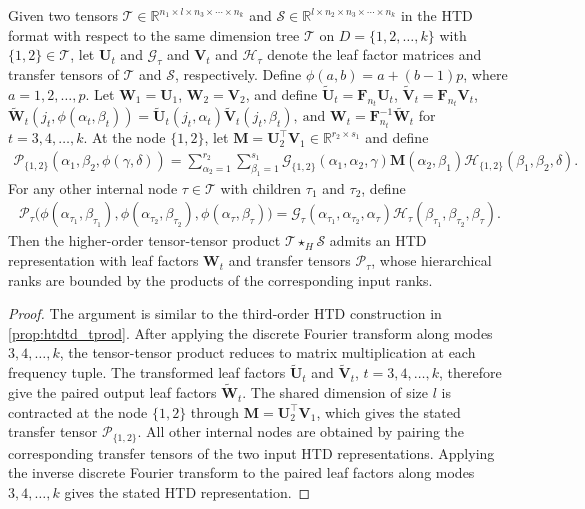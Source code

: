 \documentclass[onefignum,onetabnum]{siamart250211}
\begin{document}
\begin{proposition}
\label{thm:htd_kth_tprod_core}
Given two tensors
$\mathscr{T}\in\mathbb{R}^{n_1\times l\times n_3\times\cdots\times n_k}$
and
$\mathscr{S}\in\mathbb{R}^{l\times n_2\times n_3\times\cdots\times n_k}$
in the HTD format with respect to the same dimension tree
$\mathcal{T}$ on $D=\{1,2, \dots,k\}$ with $\{1,2\}\in\mathcal{T}$,
let $\textbf{U}_t$ and $\mathscr{G}_\tau$ and $\textbf{V}_t$ and $\mathscr{H}_\tau$
denote the leaf factor matrices and transfer tensors of $\mathscr{T}$ and
$\mathscr{S}$, respectively. Define $\phi(a,b)=a+(b-1)p$, where $a = 1,2, \dots,p$.
Let $\textbf{W}_1=\textbf{U}_1$, $\textbf{W}_2=\textbf{V}_2$, and define
$\widetilde{\textbf{U}}_t=\textbf{F}_{n_t}\textbf{U}_t$,
$\widetilde{\textbf{V}}_t=\textbf{F}_{n_t}\textbf{V}_t$,
$\widetilde{\textbf{W}}_t(j_t,\phi(\alpha_t,\beta_t))
=
\widetilde{\textbf{U}}_t(j_t,\alpha_t)
\widetilde{\textbf{V}}_t(j_t,\beta_t),
\ \text{and }
\textbf{W}_t=\textbf{F}_{n_t}^{-1}\widetilde{\textbf{W}}_t$ for
$t=3, 4, \dots,k$. At the node
$\{1,2\}$, let $\textbf{M}=\textbf{U}_2^\top\textbf{V}_1\in\mathbb{R}^{r_2\times s_1}$
and define
\begin{align*}
\mathscr{P}_{\{1,2\}}(\alpha_1,\beta_2,\phi(\gamma,\delta))
=
\sum_{\alpha_2=1}^{r_2}\sum_{\beta_1=1}^{s_1}
\mathscr{G}_{\{1,2\}}(\alpha_1,\alpha_2,\gamma)
\textbf{M}(\alpha_2,\beta_1)
\mathscr{H}_{\{1,2\}}(\beta_1,\beta_2,\delta).
\end{align*}
For any other internal node $\tau\in\mathcal{T}$ with children $\tau_1$ and
$\tau_2$, define
\begin{align*}
\mathscr{P}_\tau
\bigl(\phi(\alpha_{\tau_1},\beta_{\tau_1}),
      \phi(\alpha_{\tau_2},\beta_{\tau_2}),
      \phi(\alpha_\tau,\beta_\tau)\bigr)
=
\mathscr{G}_\tau(\alpha_{\tau_1},\alpha_{\tau_2},\alpha_\tau)
\mathscr{H}_\tau(\beta_{\tau_1},\beta_{\tau_2},\beta_\tau).
\end{align*}
Then the higher-order tensor-tensor product $\mathscr{T}\star_H\mathscr{S}$ admits an HTD representation with leaf factors $\textbf{W}_t$ and transfer tensors $\mathscr{P}_\tau$, whose hierarchical ranks
are bounded by the products of the corresponding input ranks.
\end{proposition}

\begin{proof}
The argument is similar to the third-order HTD construction in \cref{prop:htdtd_tprod}. After applying the discrete Fourier transform along modes $3, 4, \dots,k$, the tensor-tensor
product reduces to matrix multiplication at each frequency tuple. The transformed
leaf factors $\widetilde{\textbf{U}}_t$ and $\widetilde{\textbf{V}}_t$,
$t=3, 4, \dots,k$, therefore give the paired output leaf factors
$\widetilde{\textbf{W}}_t$. The shared dimension of size $l$ is contracted at the
node $\{1,2\}$ through $\textbf{M}=\textbf{U}_2^\top\textbf{V}_1$, which gives
the stated transfer tensor $\mathscr{P}_{\{1,2\}}$. All other internal nodes are
obtained by pairing the corresponding transfer tensors of the two input HTD
representations. Applying the inverse discrete Fourier transform to the paired leaf factors along modes
$3, 4, \dots,k$ gives the stated HTD representation.
\end{proof}
\end{document}

